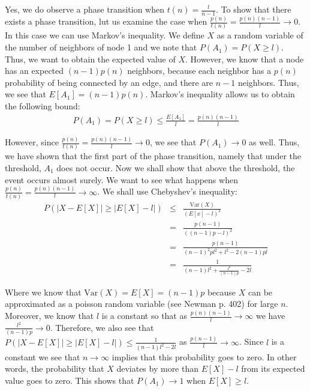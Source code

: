 \documentclass[psamsfonts]{amsart}
\newenvironment{sol}{{\bfseries Solution:}}{\qedsymbol}
\begin{document}
\begin{sol}
  Yes, we do observe a phase transition when $t(n) = \frac{l}{n-1}$. To show that there exists a phase transition, lut us examine the case when $\frac{p(n)}{t(n)} = \frac{p(n) (n-1)}{l} \to 0$. In this case we can use Markov's inequality. We define $X$ as a random variable of the number of neighbors of node 1 and we note that $P(A_1) = P(X \geq l)$. Thus, we want to obtain the expected value of $X$. However, we know that a node has an expected $(n-1) p(n)$ neighbors, because each neighbor has a $p(n)$ probability of being connected by an edge, and there are $n-1$ neighbors. Thus, we see that $E[A_1] = (n-1) p(n)$. Markov's inequality allows us to obtain the following bound:
  \begin{eqnarray}
    P(A_1) = P(X \geq l) \leq \frac{E[A_1]}{l} = \frac{p(n) (n-1)}{l}
  \end{eqnarray}

  However, since $\frac{p(n)}{t(n)} = \frac{p(n) (n-1)}{l} \to 0$, we see that $P(A_1) \to 0$ as well. Thus, we have shown that the first part of the phase transition, namely that under the threshold, $A_1$ does not occur. Now we shall show that above the threshold, the event occurs almost surely. We want to see what happens when $\frac{p(n)}{t(n)} = \frac{p(n) (n-1)}{l} \to \infty$. We shall use Chebyshev's inequality:
\begin{eqnarray}
  P(|X - E[X]| \geq |E[X] - l|) &\leq& \frac{\mathrm{Var}(X)}{(E[x] - l)^2} \\
                                &=& \frac{p(n-1)}{((n-1)p - l)^2} \\
                                &=& \frac{p(n-1)}{(n-1)^2p l^2 + l^2 - 2(n-1)pl} \\
                                &=& \frac{1}{(n-1)l^2 + \frac{l^2}{(n-1)p} - 2l}
\end{eqnarray}

Where we know that $\mathrm{Var}(X) = E[X] = (n-1)p$ because $X$ can be approximated as a poisson random variable (see Newman p. 402) for large $n$. Moreover, we know that $l$ is a constant so that as $\frac{p(n)(n-1)}{l} \to \infty$ we have $\frac{l^2}{(n-1)p} \to 0$. Therefore, we also see that $P(|X - E[X]| \geq |E[X] - l|) \leq \frac{1}{(n-1) l^2 - 2l}$ as $\frac{p (n-1)}{l} \to \infty$. Since $l$ is a constant we see that $n \to \infty$ implies that this probability goes to zero. In other words, the probability that $X$ deviates by more than $E[X] - l$ from its expected value goes to zero. This shows that $P(A_1) \to 1$ when $E[X] \geq l$.
\end{sol}
\end{document}
